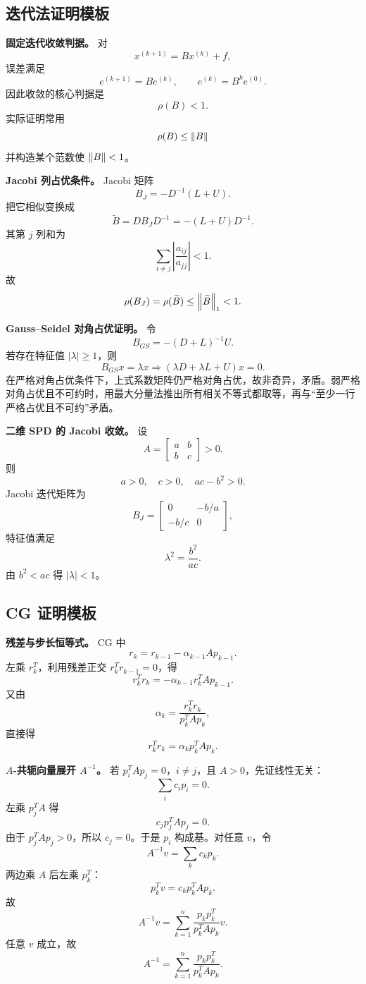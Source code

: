 \documentclass{article}
\begin{document}
\subsection{迭代法证明模板}

\textbf{固定迭代收敛判据。} 对
\[
  x^{(k+1)}=Bx^{(k)}+f,
\]
误差满足
\[
  e^{(k+1)}=Be^{(k)},\qquad e^{(k)}=B^ke^{(0)}.
\]
因此收敛的核心判据是
\[
  \rho(B)<1.
\]
实际证明常用
\[
  \rho(B)\le\left\| B \right\|
\]
并构造某个范数使 $\left\| B \right\|<1$。

\textbf{Jacobi 列占优条件。} Jacobi 矩阵
\[
  B_J=-D^{-1}(L+U).
\]
把它相似变换成
\[
  \widetilde B=DB_JD^{-1}=-(L+U)D^{-1}.
\]
其第 $j$ 列和为
\[
  \sum_{i\ne j}\left|\frac{a_{ij}}{a_{jj}}\right|<1.
\]
故
\[
  \rho(B_J)=\rho(\widetilde B)\le\left\| \widetilde B \right\|_1<1.
\]

\textbf{Gauss--Seidel 对角占优证明。} 令
\[
  B_{GS}=-(D+L)^{-1}U.
\]
若存在特征值 $|\lambda|\ge1$，则
\[
  B_{GS}x=\lambda x
  \Rightarrow
  (\lambda D+\lambda L+U)x=0.
\]
在严格对角占优条件下，上式系数矩阵仍严格对角占优，故非奇异，矛盾。弱严格对角占优且不可约时，用最大分量法推出所有相关不等式都取等，再与“至少一行严格占优且不可约”矛盾。

\textbf{二维 SPD 的 Jacobi 收敛。} 设
\[
  A=\begin{bmatrix}a&b\\b&c\end{bmatrix}>0.
\]
则
\[
  a>0,\quad c>0,\quad ac-b^2>0.
\]
Jacobi 迭代矩阵为
\[
  B_J=\begin{bmatrix}0&-b/a\\-b/c&0\end{bmatrix},
\]
特征值满足
\[
  \lambda^2=\frac{b^2}{ac}.
\]
由 $b^2<ac$ 得 $|\lambda|<1$。

\subsection{CG 证明模板}

\textbf{残差与步长恒等式。} CG 中
\[
  r_k=r_{k-1}-\alpha_{k-1}Ap_{k-1}.
\]
左乘 $r_k^T$，利用残差正交 $r_k^Tr_{k-1}=0$，得
\[
  r_k^Tr_k=-\alpha_{k-1}r_k^TAp_{k-1}.
\]
又由
\[
  \alpha_k=\frac{r_k^Tr_k}{p_k^TAp_k},
\]
直接得
\[
  r_k^Tr_k=\alpha_kp_k^TAp_k.
\]

\textbf{$A$-共轭向量展开 $A^{-1}$。} 若 $p_i^TAp_j=0$，$i\ne j$，且 $A>0$，先证线性无关：
\[
  \sum_i c_ip_i=0.
\]
左乘 $p_j^TA$ 得
\[
  c_jp_j^TAp_j=0.
\]
由于 $p_j^TAp_j>0$，所以 $c_j=0$。于是 $p_i$ 构成基。对任意 $v$，令
\[
  A^{-1}v=\sum_k c_kp_k.
\]
两边乘 $A$ 后左乘 $p_k^T$：
\[
  p_k^Tv=c_kp_k^TAp_k.
\]
故
\[
  A^{-1}v=\sum_{k=1}^n\frac{p_kp_k^T}{p_k^TAp_k}v.
\]
任意 $v$ 成立，故
\[
  A^{-1}=\sum_{k=1}^n\frac{p_kp_k^T}{p_k^TAp_k}.
\]
\end{document}
